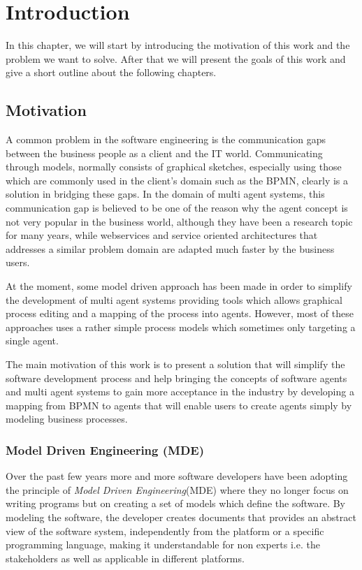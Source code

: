 \chapter{Introduction}

In this chapter, we will start by introducing the motivation of this work and the problem we want to solve. After that we will present the goals of this work and give a short outline about the following chapters.
\section{Motivation}
\label{sec:Motivation}
A common problem in the software engineering is the communication gaps between the business people as a client and the IT world.  Communicating through models, normally consists of graphical sketches, especially using those which are commonly used in the client's domain such as the BPMN, clearly is a solution in bridging these gaps. In the domain of multi agent systems, this communication gap is believed to be one of the reason why the agent concept is not very popular in the business world, although they have been a research topic for many years, while webservices and service oriented architectures that addresses a similar problem domain are adapted much faster by the business users.

At the moment, some model driven approach has been made in order to simplify the development of multi agent systems providing tools which allows graphical process editing and a mapping of the process into agents. However, most of these approaches uses a rather simple process models which sometimes only targeting a single agent.  

The main motivation of this work is to present a solution that will simplify the software development process and help bringing the concepts of software agents and multi agent systems to gain more acceptance in the industry by developing a mapping from BPMN to agents that will enable users to create agents simply by modeling business processes.\\

\subsection{Model Driven Engineering (MDE)}
Over the past few years more and more software developers have been adopting the principle of \textit{Model Driven Engineering}(MDE) where 
they no longer focus on writing programs but on creating a set of models which define the software. By modeling the software, the developer creates documents that provides an abstract view of the software system, independently from the platform or a specific programming language, making it understandable for non experts i.e. the stakeholders as well as applicable in different platforms. 

